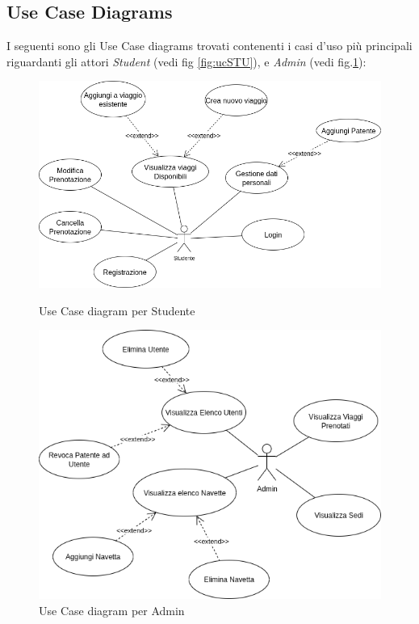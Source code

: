 \subsection{Use Case Diagrams}
I seguenti sono gli Use Case diagrams trovati contenenti i casi d'uso più principali riguardanti gli attori \textit{Student} (vedi fig \ref{fig:ucSTU}), e \textit{Admin} (vedi fig.\ref{fig:ucADM}):
\begin{figure}[H]
    \centering
    \includegraphics[width=1.2\linewidth]{Images/Student UC.png}
    \caption{Use Case diagram per Studente}
    \label{fig:ucSTU}

    \vspace{0.5cm}

    \centering
    \includegraphics[width=1\linewidth]{Images/Admin UC.png}
    \caption{Use Case diagram per Admin}
    \label{fig:ucADM}
\end{figure}

